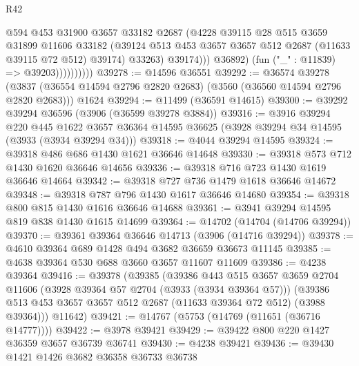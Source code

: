 \begin{lexlean}{R42}
\begin{coremodule}
                              @594
                              @453
                              @31900
                              @3657
                              @33182
                              @2687
                              (@4228
                                @39115
                                @28
                                @515
                                @3659
                                @31899
                                @11606
                                @33182
                                (@39124
                                  @513
                                  @453
                                  @3657
                                  @3657
                                  @512
                                  @2687
                                  (@11633 @39115 @72 @512)
                                  @39174)
                                @33263)
                              @39174)))
                        @36892)
                      (fun ("_" : @11839) => @39203))))))))))
@39278 := @14596 @36551
@39292 := @36574
    @39278
    (@3837 (@36554 @14594 @2796 @2820 @2683) (@3560 (@36560 @14594 @2796 @2820 @2683)))
    @1624
@39294 := @11499 (@36591 @14615)
@39300 := @39292 @39294 @36596 (@3906 (@36599 @39278 @3884))
@39316 := @3916
    @39294
    @220
    @445
    @1622
    @3657
    @36364
    @14595
    @36625
    (@3928 @39294 @34 @14595 (@3933 (@3934 @39294 @34)))
@39318 := @4044 @39294 @14595
@39324 := @39318 @486 @686 @1430 @1621 @36646 @14648
@39330 := @39318 @573 @712 @1430 @1620 @36646 @14656
@39336 := @39318 @716 @723 @1430 @1619 @36646 @14664
@39342 := @39318 @727 @736 @1479 @1618 @36646 @14672
@39348 := @39318 @787 @796 @1430 @1617 @36646 @14680
@39354 := @39318 @800 @815 @1430 @1616 @36646 @14688
@39361 := @3941 @39294 @14595 @819 @838 @1430 @1615 @14699
@39364 := @14702 (@14704 (@14706 @39294))
@39370 := @39361 @39364 @36646 @14713 (@3906 (@14716 @39294))
@39378 := @4610 @39364 @689 @1428 @494 @3682 @36659 @36673 @11145
@39385 := @4638 @39364 @530 @688 @3660 @3657 @11607 @11609
@39386 := @4238 @39364
@39416 := @39378
    (@39385
      (@39386
        @443
        @515
        @3657
        @3659
        @2704
        @11606
        (@3928 @39364 @57 @2704 (@3933 (@3934 @39364 @57)))
        (@39386 @513 @453 @3657 @3657 @512 @2687 (@11633 @39364 @72 @512) (@3988 @39364)))
      @11642)
@39421 := @14767 (@5753 (@14769 (@11651 (@36716 @14777))))
@39422 := @3978 @39421
@39429 := @39422 @800 @220 @1427 @36359 @3657 @36739 @36741
@39430 := @4238 @39421
@39436 := @39430 @1421 @1426 @3682 @36358 @36733 @36738

\end{coremodule}
\end{lexlean}
